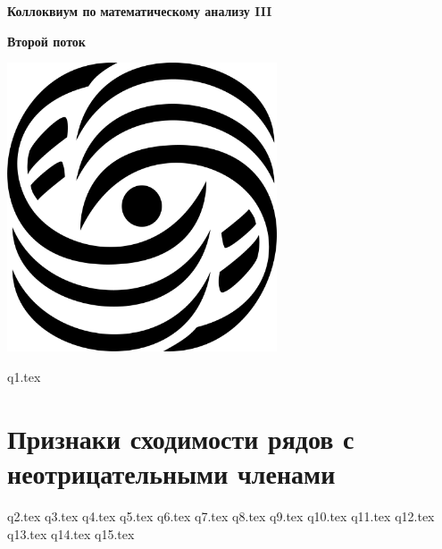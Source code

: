 \documentclass[openany]{book}
\begin{document}
	
	
	\begin{titlepage}
		\centering
		
		\vspace*{2cm}
		
		{\Huge\bfseries Коллоквиум по}
		{\Huge\bfseries математическому анализу III}
		
		{\Huge\bfseries Второй поток}
		
		\vspace*{2.2cm}
		
		\includegraphics[width=0.6\textwidth]{logo.png}
	\end{titlepage}
	\clearpage
	\hypertarget{intro}{}
	\tableofcontents
	\clearpage
	
	\pagestyle{fancy}
	\setcounter{page}{1}
	\fancyhf{}
	\fancyhead[LE]{\thepage}
	\fancyhead[RO]{\thepage}
	
	{q1.tex}
	\section*{Признаки сходимости рядов с неотрицательными членами}
	{q2.tex}
	{q3.tex}
	{q4.tex}
	\newpage
	{q5.tex}
	{q6.tex}
	{q7.tex}
	{q8.tex}
	{q9.tex}
	{q10.tex}   
	{q11.tex}
	{q12.tex}
	{q13.tex}
	{q14.tex}
	{q15.tex}
	
\end{document}
